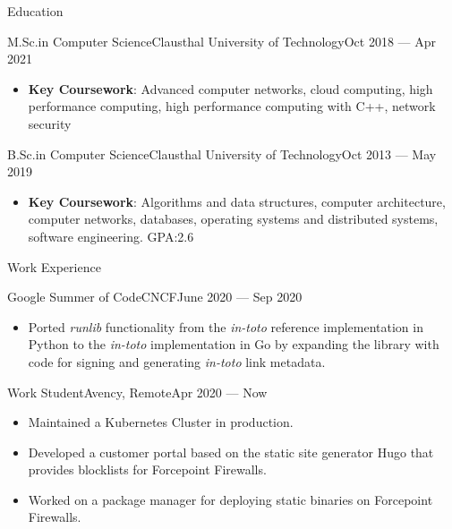 \documentclass[]{mcdowellcv}
\begin{document}
\makeheader%

\begin{cvsection}{Education}
\begin{cvsubsection}{M.Sc.\@ in Computer Science}{Clausthal University of Technology}{Oct 2018 --- Apr 2021}
\bigskip
\begin{itemize}
\item \textbf{Key Coursework}: Advanced computer networks, cloud computing, high performance computing, high performance computing with C++, network security
\end{itemize}
\end{cvsubsection}
\begin{cvsubsection}{B.Sc.\@ in Computer Science}{Clausthal University of Technology}{Oct 2013 --- May 2019}
\bigskip
\begin{itemize}
\item \textbf{Key Coursework}: Algorithms and data structures, computer architecture, computer networks, databases, operating systems and distributed systems, software engineering. GPA:\@ 2.6
\end{itemize}
\end{cvsubsection}

\begin{cvsection}{Work Experience}
\begin{cvsubsection}{Google Summer of Code}{CNCF}{June 2020 --- Sep 2020}
\begin{itemize}
\item Ported \textit{runlib} functionality from the \textit{in-toto} reference implementation in Python to the \textit{in-toto} implementation in Go by expanding the library with code for signing and generating \textit{in-toto} link metadata.
\end{itemize}
\end{cvsubsection}
\begin{cvsubsection}{Work Student}{Avency, Remote}{Apr 2020 --- Now}
\begin{itemize}
\item Maintained a Kubernetes Cluster in production.
\item Developed a customer portal based on the static site generator Hugo that provides blocklists for Forcepoint Firewalls.
\item Worked on a package manager for deploying static binaries on Forcepoint Firewalls.
\end{itemize}
\end{cvsubsection}


\end{cvsection}
\end{cvsection}
\end{document}
